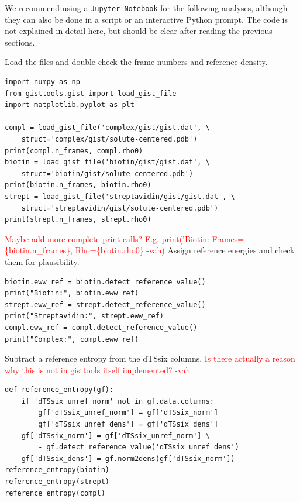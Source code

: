 \documentclass[9pt,tutorial]{livecoms}
\newcommand{\software}{\texttt}
\newcommand{\todo}{\textcolor{red}}
\begin{document}
We recommend using a \software{Jupyter Notebook} for the following analyses, although they can also be done in a script or an interactive Python prompt.
The code is not explained in detail here, but should be clear after reading the previous sections.

Load the files and double check the frame numbers and reference density.
\begin{lstlisting}[style=python]
import numpy as np
from gisttools.gist import load_gist_file
import matplotlib.pyplot as plt

compl = load_gist_file('complex/gist/gist.dat', \
    struct='complex/gist/solute-centered.pdb')
print(compl.n_frames, compl.rho0)
biotin = load_gist_file('biotin/gist/gist.dat', \
    struct='biotin/gist/solute-centered.pdb')
print(biotin.n_frames, biotin.rho0)
strept = load_gist_file('streptavidin/gist/gist.dat', \
    struct='streptavidin/gist/solute-centered.pdb')
print(strept.n_frames, strept.rho0)
\end{lstlisting}
\todo{Maybe add more complete print calls? E.g. print('Biotin: Frames=\{biotin.n\_frames\}, Rho=\{biotin.rho0\} -vah)}
Assign reference energies and check them for plausibility.
\begin{lstlisting}[style=python]
biotin.eww_ref = biotin.detect_reference_value()
print("Biotin:", biotin.eww_ref)
strept.eww_ref = strept.detect_reference_value()
print("Streptavidin:", strept.eww_ref)
compl.eww_ref = compl.detect_reference_value()
print("Complex:", compl.eww_ref)
\end{lstlisting}

Subtract a reference entropy from the dTSsix columns.
\todo{Is there actually a reason why this is not in gisttools itself implemented? -vah}
\begin{lstlisting}[style=python]
def reference_entropy(gf):
    if 'dTSsix_unref_norm' not in gf.data.columns:
        gf['dTSsix_unref_norm'] = gf['dTSsix_norm']
        gf['dTSsix_unref_dens'] = gf['dTSsix_dens']
    gf['dTSsix_norm'] = gf['dTSsix_unref_norm'] \
        - gf.detect_reference_value('dTSsix_unref_dens')
    gf['dTSsix_dens'] = gf.norm2dens(gf['dTSsix_norm'])
reference_entropy(biotin)
reference_entropy(strept)
reference_entropy(compl)
\end{lstlisting}
\end{document}
